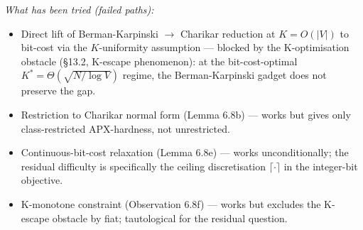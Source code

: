 \documentclass[
]{article}
\begin{document}
\emph{What has been tried (failed paths):}
\begin{itemize}
\item Direct lift of Berman-Karpinski $\to$ Charikar reduction at
$K = O(|V|)$ to bit-cost via the $K$-uniformity assumption ---
blocked by the K-optimisation obstacle (§13.2, K-escape phenomenon):
at the bit-cost-optimal $K^* = \Theta(\sqrt{N/\log V})$ regime, the
Berman-Karpinski gadget does not preserve the gap.
\item Restriction to Charikar normal form (Lemma 6.8b) --- works but
gives only class-restricted APX-hardness, not unrestricted.
\item Continuous-bit-cost relaxation (Lemma 6.8e) --- works
unconditionally; the residual difficulty is specifically the
ceiling discretisation $\lceil \cdot \rceil$ in the integer-bit
objective.
\item K-monotone constraint (Observation 6.8f) --- works but excludes
the K-escape obstacle by fiat; tautological for the residual question.
\end{itemize}
\end{document}
